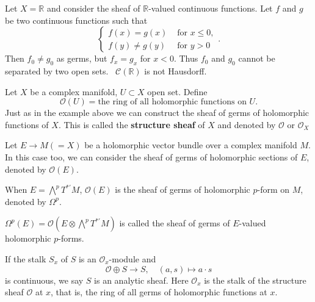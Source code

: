 \documentclass[12pt]{article}
\begin{document}
\begin{example}
  Let \(X=\mathbb{R}\) and consider the sheaf of \(\mathbb{R}\)-valued continuous
  functions. Let \(f\) and \(g\) be two continuous functions such that \[
    \begin{cases}
      f(x)=g(x) & \text{ for } x\le 0, \\
      f(y)\neq g(y) & \text{ for } y>0
    \end{cases}
  .\] Then \(f_0\neq g_0\) as germs, but \(f_x=g_x\) for \(x<0\). Thus \(f_0\) and
  \(g_0\) cannot be separated by two open sets. \ie\ \(\mathcal{C}(\mathbb{R})\) is
  not Hausdorff.
\end{example}

\begin{example}
  Let \(X\) be a complex manifold, \(U\subset X\) open set. Define \[
    \mathcal{O}(U)=\text{the ring of all holomorphic functions on }U
  .\] Just as in the example above we can construct the sheaf of germs of holomorphic
  functions of \(X\). This is called the \textbf{structure sheaf} of \(X\) and denoted
  by \(\mathcal{O}\) or \(\mathcal{O}_X\)
\end{example}

\begin{definition}
  Let \(E\to M(=X)\) be a holomorphic vector bundle over a complex manifold \(M\).
  In this case too, we can consider the sheaf of germs of holomorphic sections of
  \(E\), denoted by \(\mathcal{O}(E)\).
\end{definition}

\begin{example}
  When \(E=\bigwedge^p T^{*\prime}M\), \(\mathcal{O}(E)\) is the sheaf of germs
  of holomorphic \(p\)-form on \(M\), denoted by \(\Omega^p\).
\end{example}

\begin{example}
  \(\Omega^p(E)=\mathcal{O}(E\otimes \bigwedge^p T^{*'}M)\) is called the sheaf of
  germs of \(E\)-valued holomorphic \(p\)-forms.
\end{example}

\begin{definition}
  If the stalk \(S_x\) of \(S\) is an \(\mathcal{O}_x\)-module and \[
    \mathcal{O}\oplus S\longrightarrow S,\quad (a,s)\longmapsto a\cdot s
  \] is continuous, we say \(S\) is an analytic sheaf. Here \(\mathcal{O}_x\) is the
  stalk of the structure sheaf \(\mathcal{O}\) at \(x\), that is, the ring of all
  germs of holomorphic functions at \(x\).
\end{definition}
\end{document}
